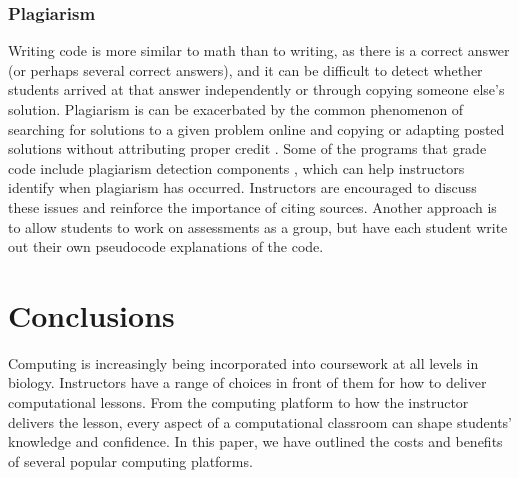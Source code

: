 \subsubsection{Plagiarism}
Writing code is more similar to math than to writing, as there is a correct answer (or perhaps several correct answers), and it can be difficult to detect whether students arrived at that answer independently or through copying someone else's solution.
Plagiarism is can be exacerbated by the common phenomenon of searching for solutions to a given problem online and copying or adapting posted solutions without attributing proper credit \citep{gaspar_restoring_2007}. 
Some of the programs that grade code include plagiarism detection components \citep{pears_survey_2007}, which can help instructors identify when plagiarism has occurred.
Instructors are encouraged to discuss these issues and reinforce the importance of citing sources.
Another approach is to allow students to work on assessments as a group, but have each student write out their own pseudocode explanations of the code.

\section{Conclusions}

Computing is increasingly being incorporated into coursework at all levels in biology. 
Instructors have a range of choices in front of them for how to deliver computational lessons.
From the computing platform to how the instructor delivers the lesson, every aspect of a computational classroom can shape students' knowledge and confidence. 
In this paper, we have outlined the costs and benefits of several popular computing platforms. 





